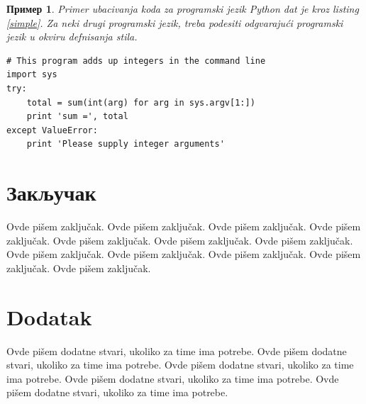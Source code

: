 \documentclass[a4paper]{article}
\newtheorem{primer}{Пример}[section] %
\begin{document}
\begin{primer}
Primer ubacivanja koda za programski jezik Python dat je kroz listing \ref{simple}. Za neki drugi programski jezik, treba podesiti odgvarajući programski jezik u okviru defnisanja stila.
\end{primer}
\begin{lstlisting}[caption={Primer ubacivanja koda u tekst},frame=single, label=simple]
# This program adds up integers in the command line
import sys
try:
    total = sum(int(arg) for arg in sys.argv[1:])
    print 'sum =', total
except ValueError:
    print 'Please supply integer arguments'
\end{lstlisting}


\section{Закључак}
\label{sec:zakljucak}

Ovde pišem zaključak. 
Ovde pišem zaključak. 
Ovde pišem zaključak. 
Ovde pišem zaključak. 
Ovde pišem zaključak. 
Ovde pišem zaključak. 
Ovde pišem zaključak. 
Ovde pišem zaključak. 
Ovde pišem zaključak. 
Ovde pišem zaključak. 
Ovde pišem zaključak. 
Ovde pišem zaključak. 


\appendix
 


\appendix
\section{Dodatak}
Ovde pišem dodatne stvari, ukoliko za time ima potrebe.
Ovde pišem dodatne stvari, ukoliko za time ima potrebe.
Ovde pišem dodatne stvari, ukoliko za time ima potrebe.
Ovde pišem dodatne stvari, ukoliko za time ima potrebe.
Ovde pišem dodatne stvari, ukoliko za time ima potrebe.
\end{document}
